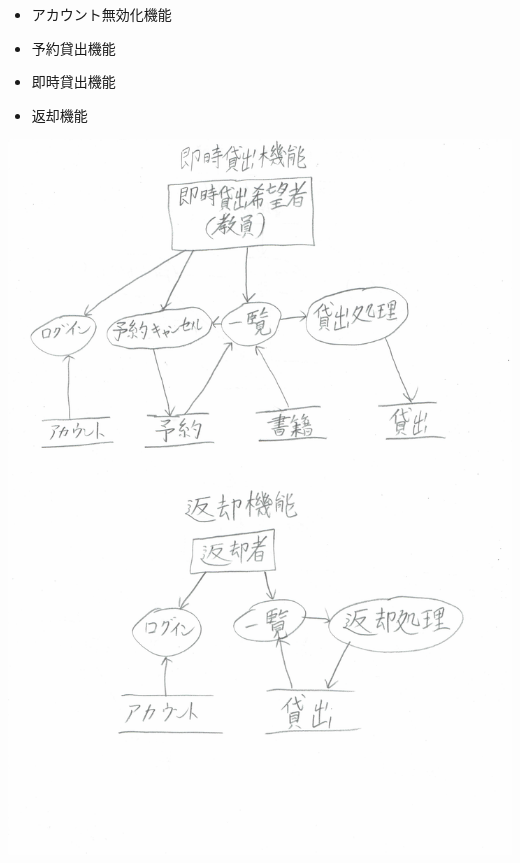 \documentclass[a4paper]{jarticle}
\begin{document}
\begin{enumerate}
 \begin{itemize}
  \item アカウント無効化機能
  \item 予約貸出機能
  \item 即時貸出機能
  \item 返却機能
 \end{itemize}
 \begin{center}
 \includegraphics[width=15cm]{compressedjpg/DFD1.JPG}
 \end{center}
 \begin{center}

\end{center}
\end{enumerate}
\end{document}
